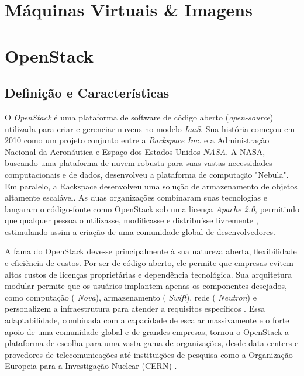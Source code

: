 \begin{itemize}
\section{Máquinas Virtuais \& Imagens}

\section{OpenStack}

\subsection{Definição e Características}

O  \textit{OpenStack} é uma plataforma de software de código aberto (\textit{open-source}) utilizada para criar e gerenciar nuvens no modelo \textit{IaaS}. Sua história começou em 2010 como um projeto conjunto entre a  \textit{Rackspace Inc.} e a Administração Nacional da Aeronáutica e Espaço dos Estados Unidos \textit{NASA}. A NASA, buscando uma plataforma de nuvem robusta para suas vastas necessidades computacionais e de dados, desenvolveu a plataforma de computação "Nebula". Em paralelo, a Rackspace desenvolveu uma solução de armazenamento de objetos altamente escalável. As duas organizações combinaram suas tecnologias e lançaram o código-fonte como OpenStack sob uma licença  \textit{Apache 2.0}, permitindo que qualquer pessoa o utilizasse, modificasse e distribuísse livremente \cite{nasa2012}, estimulando assim a criação de uma comunidade global de desenvolvedores.

A fama do OpenStack deve-se principalmente à sua natureza aberta, flexibilidade e eficiência de custos. Por ser de código aberto, ele permite que empresas evitem altos custos de licenças proprietárias e dependência tecnológica. Sua arquitetura modular permite que os usuários implantem apenas os componentes desejados, como computação ( \textit{Nova}), armazenamento ( \textit{Swift}), rede ( \textit{Neutron}) e personalizem a infraestrutura para atender a requisitos específicos \cite{grzonka2015}. Essa adaptabilidade, combinada com a capacidade de escalar massivamente e o forte apoio de uma comunidade global e de grandes empresas, tornou o OpenStack a plataforma de escolha para uma vasta gama de organizações, desde data centers e provedores de telecomunicações até instituições de pesquisa como a Organização Europeia para a Investigação Nuclear (CERN) \cite{rousseau2019}.


\end{itemize}
